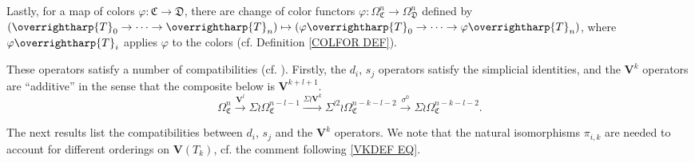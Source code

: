 \documentclass[a4paper,10pt
]{article}%
\numberwithin{equation}{section}
\numberwithin{figure}{section}
\theoremstyle{definition} %
\newcommand{\vect}[1]{\text{\overrightharp{\ensuremath{#1}}}}
\newcommand{\1}{\ensuremath{\mathbbm 1}}%
\begin{document}
Lastly, for a map of colors 
$\varphi \colon \mathfrak{C} \to \mathfrak{D}$,
there are change of color functors
$\varphi \colon \Omega^n_{\mathfrak{C}} \to \Omega^n_{\mathfrak{D}}$
defined by
$(\vect{T}_0 \to \cdots \to \vect{T}_n)
\mapsto 
(\varphi\vect{T}_0 \to \cdots \to \varphi\vect{T}_n)$,
where $\varphi \vect{T}_i$
applies $\varphi$ to the colors 
(cf. Definition \ref{COLFOR DEF}).


These operators satisfy a number of compatibilities (cf. \cite[Prop. 3.102]{BP21}). Firstly, the $d_i$, $s_j$ operators satisfy the  simplicial identities, 
and the $\boldsymbol{V}^k$ operators are ``additive'' in the sense that
the composite below is $\boldsymbol{V}^{k+l+1}$.
\begin{equation}\label{VKADD EQ}
\Omega^{n}_{\mathfrak{C}} \xrightarrow{\boldsymbol{V}^l} 
\Sigma \wr \Omega^{n-l-1}_{\mathfrak{C}} \xrightarrow{\Sigma \wr \boldsymbol{V}^k}
\Sigma^{\wr 2} \wr \Omega^{n-k-l-2}_{\mathfrak{C}} \xrightarrow{\sigma^0}
\Sigma \wr \Omega^{n-k-l-2}_{\mathfrak{C}}.
\end{equation}


The next results list the compatibilities between $d_i$, $s_j$ and the $\boldsymbol{V}^k$ operators.
We note that the natural isomorphisms $\pi_{i,k}$
are needed to account for different orderings on 
$\boldsymbol{V}(T_k)$,
cf. the comment following \eqref{VKDEF EQ}.
\end{document}
